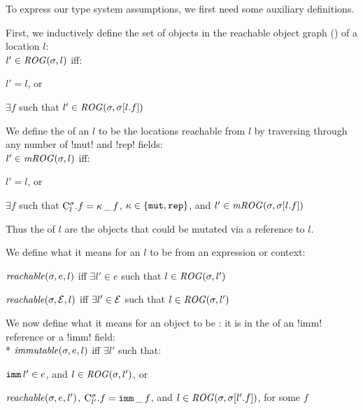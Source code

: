 To express our type system assumptions, we first need some auxiliary definitions. 
\LS

\noindent First, we inductively define the set of objects in the reachable object graph (\rog) of a location $l$:\\
\indent $l' \in \mathit{ROG}(\sigma, l)$ iff:%
\begin{iitemize}
	\item $l' = l$, or\SS
	\item $\exists f$ such that $l' \in \mathit{ROG}(\sigma, \sigma[l.f])$
\end{iitemize}
\LS
We define the \mrog of an $l$ to be the locations reachable from $l$ by traversing through any number of \Q!mut! and \Q!rep! fields:\\
\indent $l' \in \mathit{mROG}(\sigma, l)$ iff:%
\begin{iitemize}
	\item $l' = l$, or\SS
	\item $\exists f$ such that $\mathrm{C}^{\sigma}_{l}.f = \kappa\,\_\,f$, $\kappa \in \{\texttt{mut},\texttt{rep}\}$, and $l' \in \mathit{mROG}(\sigma, \sigma[l.f])$
\end{iitemize}
Thus the \mrog of $l$ are the objects that could be mutated via a reference to $l$.

\LS
\noindent We define what it means for an $l$ to be \reach from an expression or context:
\begin{iitemize}
\item $\mathit{reachable}(\sigma, e, l)$ iff $\exists l' \in e$ such that $l \in \mathit{ROG}(\sigma, l')$\SS
\item $\mathit{reachable}(\sigma, \mathcal{E}, l)$ iff $\exists l' \in \mathcal{E}$ such that $l \in \mathit{ROG}(\sigma, l')$
\end{iitemize}

\LS

We now define what it means for an object to be \immut: it is in the \rog of an \Q!imm! reference or a \reach \Q!imm! field:\\*
\indent $\mathit{immutable}(\sigma, e, l)$ iff $\exists l'$ such that:
\begin{iitemize}
\item $\texttt{imm}\,l' \in e$, and $l \in \mathit{ROG}(\sigma, l')$, or\SS
\item $\mathit{reachable}(\sigma, e, l')$, $\mathrm{C}^{\sigma}_{l'}.f = \texttt{imm}\,\_\,f$, and $l \in \mathit{ROG}(\sigma, \sigma[l'.f])$, for some $f$
\end{iitemize}

